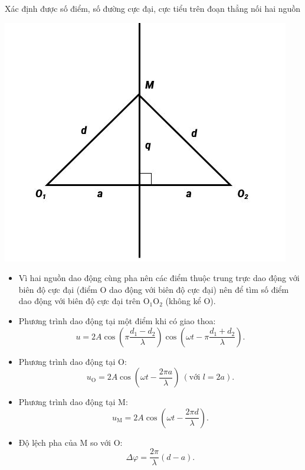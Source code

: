 \begin{dang}{Xác định được số điểm, số đường cực đại, cực tiểu trên đoạn thẳng nối hai nguồn}
{\begin{center}
			\vspace*{1em}
			\includegraphics[scale=0.9]{../figs/VN12-PH-11-A-007-1-V2-1.JPG}
		\end{center}
		\begin{itemize}
			\item Vì hai nguồn dao động cùng pha nên các điểm thuộc trung trực dao động với biên độ cực đại (điểm O dao động với biên độ cực đại) nên để tìm số điểm dao động với biên độ cực đại trên $\text{O}_1\text{O}_2$ (không kể O).
			\item Phương trình dao động tại một điểm khi có giao thoa:
			\begin{equation*}
				u =2A \cos \left (\pi \dfrac {d_1-d_2}{\lambda}\right) \cos \left(\omega t -\pi \dfrac{d_1+d_2}{\lambda}\right).
			\end{equation*}
			\item Phương trình dao động tại O:
			\begin{equation*}
				u_{\text{O}} = 2A \cos \left(\omega t - \dfrac{2\pi a}{\lambda}\right)\ (\text{với } l=2a).
			\end{equation*}
			\item Phương trình dao động tại M:
			\begin{equation*}
				u_{\text{M}} = 2A \cos \left(\omega t - \dfrac{2\pi d}{\lambda}\right).
			\end{equation*}
			\item Độ lệch pha của M so với O:
			\begin{equation*}
				\Delta \varphi = \dfrac{2\pi}{\lambda} (d-a).
			\end{equation*}

\end{itemize}}
\end{dang}
